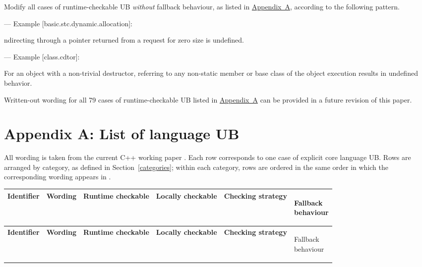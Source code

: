 {Modify all cases of runtime-checkable UB \emph{without} fallback behaviour, as listed in \hyperref[appendix]{Appendix~A}, according to the following pattern. 

--- Example [basic.stc.dynamic.allocation]:

\begin{adjustwidth}{0.5cm}{0.5cm}
ndirecting through a pointer  returned from a request for zero size is undefined.
\end{adjustwidth}

--- Example [class.cdtor]:

\begin{adjustwidth}{0.5cm}{0.5cm}
For an object with a non-trivial destructor, referring to any non-static member or base class of the object  execution results in undefined behavior.
\end{adjustwidth}

Written-out wording for all 79 cases of runtime-checkable UB listed in \hyperref[appendix]{Appendix~A} can be provided in a future revision of this paper.

\section*{Appendix A: List of language UB}
\label{appendix}

All wording is taken from the current C++ working paper \cite{N5008}. Each row corresponds to one case of explicit core language UB. Rows are arranged by category, as defined in Section~\ref{categories}; within each category, rows are ordered in the same order in which the corresponding wording appears in \cite{N5008}.


\pagebreak
\begin{landscape}

\renewcommand\arraystretch{1.5}%
\begin{longtable}{|p{2.4cm}|p{6.5cm}|p{1.9cm}|p{1.9cm}|p{6.7cm}|p{2.5cm}|}
\hline
{\bfseries Identifier} & {\bfseries Wording} & {\bfseries Runtime checkable} & {\bfseries Locally checkable} & {\bfseries Checking strategy} & {\bfseries\raggedright Fallback\\ behaviour}
\tabularnewline \hline
\endfirsthead
\hline
{\bfseries Identifier} & {\bfseries Wording} & {\bfseries Runtime checkable} & {\bfseries Locally checkable} & {\bfseries Checking strategy} & {\bfseries\raggedright Fallback\\ behaviour}
\tabularnewline \hline
\endhead


\end{longtable}
\end{landscape}}
